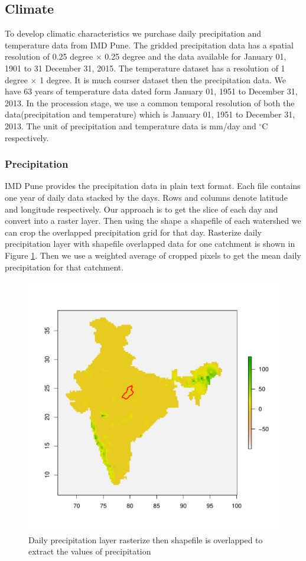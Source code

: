 \documentclass[a4paper, 12pt]{article}
\begin{document}
\subsection{Climate}
To develop climatic characteristics we purchase daily precipitation and temperature data from IMD Pune. The gridded precipitation data has a spatial resolution of 0.25 degree $\times$ 0.25 degree and the data available for January 01, 1901 to 31 December 31, 2015. The temperature dataset has a resolution of 1 degree $\times$ 1 degree.  It is much courser dataset then the precipitation data. We have 63 years of temperature data dated form January 01, 1951 to December 31, 2013. In the procession stage, we use a common temporal resolution of both the data(precipitation and temperature) which is January 01, 1951 to December 31, 2013. The unit of precipitation and temperature data is mm/day and $^\circ$C respectively.
\subsubsection{Precipitation}
IMD Pune provides the precipitation data in plain text format. Each file contains one year of daily data stacked by the days. Rows and columns denote latitude and longitude respectively. Our approach is to get the slice of each day and convert into a raster layer. Then using the shape a shapefile of each watershed we can crop the overlapped precipitation grid for that day. Rasterize daily precipitation layer with shapefile overlapped data for one catchment is shown in Figure \ref{fig:precipExt}. Then we use a weighted average of cropped pixels to get the mean daily precipitation for that catchment.

\begin{figure}[!h]
\centering
\includegraphics[width = 1\textwidth]{Figures/PrecipitationExt.pdf}
\caption{Daily precipitation layer rasterize then shapefile is overlapped to extract the values of precipitation}
\label{fig:precipExt}
\end{figure}
\end{document}
